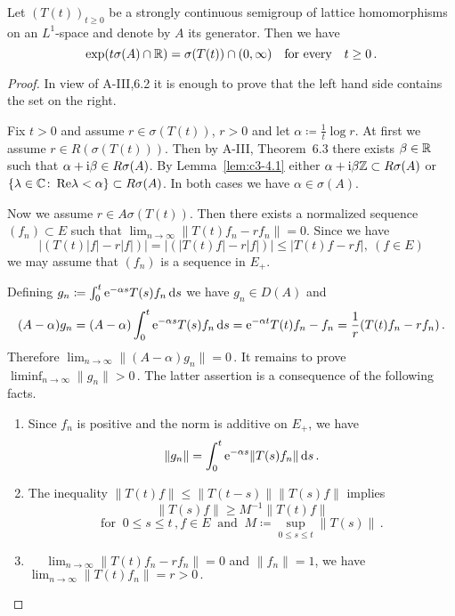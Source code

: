 \begin{proposition}\label{prop:c3-4.5}
Let $(T(t))_{t \geq 0}$ be a strongly continuous semigroup
of lattice homomorphisms on an $L^1$-space and denote by $A$ its generator.
Then we have
\begin{equation}\label{eq:c3-4.7}
	\exp(t\sigma(A) \cap \mathbb{R} ) = \sigma(T(t)) \cap (0,\infty) \quad \text{for every} \quad t \geq 0\,.
\end{equation}
\end{proposition}
\begin{proof}
In view of A-III,6.2 it is enough to prove that the left hand
side contains the set on the right.

Fix $t > 0$ and assume $r \in \sigma(T(t))$, $r > 0$ and let $\alpha \coloneqq \frac{1}{t} \log r$.
At first we assume $r \in R(\sigma(T(t)))$.
Then by A-III, Theorem~6.3 there exists
$\beta \in \mathbb{R} $ such that $\alpha+\mathrm{i}\beta \in R\sigma(A)$.
By Lemma~\ref{lem:c3-4.1} either $\alpha+\mathrm{i}\beta\mathbb{Z} \subset R\sigma(A)$
or $\{\lambda \in \mathbb{C}  \colon \mathop{}\!\mathrm{Re}  \lambda < \alpha\} \subset R\sigma(A)$.
In both cases we have $\alpha \in \sigma(A)$.

Now we assume $r \in A\sigma(T(t))$. 
Then there exists a normalized sequence
$(f_n) \subset E$ such that $\lim_{n \to \infty}\|T(t)f_n - rf_n\| = 0$.
Since we have
\[
|(T(t)|f| - r|f|)| = |(|T(t)f| - r|f|)| \leq |T(t)f - rf|, \  (f \in E) 
\]
we may assume that $(f_n)$ is a sequence in $E_+$.

Defining $g_n \coloneqq \int_{0}^{t} \mathrm{e}^{-\alpha s}T(s)f_n \mathop{}\!\mathrm{d}{s} $ we have $g_n \in D(A)$ and
\[
(A-\alpha)g_n = (A-\alpha)\int_{0}^{t} \mathrm{e}^{-\alpha s}T(s)f_n \mathop{}\!\mathrm{d}{s} = \mathrm{e}^{-\alpha t}T(t)f_n - f_n = \frac{1}{r}(T(t)f_n - rf_n)\,.
\]
Therefore $\lim_{n \to \infty}\|(A - \alpha) g_n\| = 0$\,. It remains to prove 
$\liminf_{n \to \infty}\|g_n\| > 0$\,.
The latter assertion is a consequence of the following facts.
\begin{enumerate}[\upshape (i),wide, labelindent=.5em]
	\item
	Since $f_n$ is positive and the norm is additive on $E_+$,
	we have
	\[
    \|g_n\| = \int_{0}^{t} \mathrm{e}^{-\alpha s}\|T(s)f_n\| \mathop{}\!\mathrm{d}{s}\,.
    \]
	
	\item 
    The inequality \quad
    $\displaystyle
    \|T(t)f\| \leq \|T(t-s)\|\|T(s)f\|
    $\quad 
    implies
	\[
    \|T(s)f\| \geq M^{-1}\|T(t)f\|
    \]
    \[
    \text{for } \ 0 \leq s \leq t\,, f \in E \ \text{ and } \ M \coloneqq \sup_{0 \leq s \leq t}\|T(s) \|\,.
    \]
    
	 \item 
	 \  \  
     $\displaystyle\lim_{n \to \infty}\|T(t)f_n - rf_n\| = 0$ 
     and $\|f_n\| = 1$, we have
    $\displaystyle
     \lim_{n \to \infty}\|T(t)f_n\| = r > 0\,.
    $
\end{enumerate}
\end{proof}
